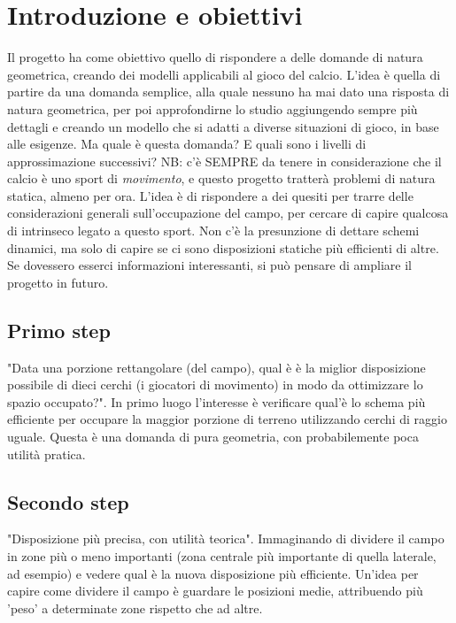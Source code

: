 \documentclass{report}
\begin{document}
\chapter{Introduzione e obiettivi}
Il progetto ha come obiettivo quello di rispondere a delle domande di natura geometrica, creando dei modelli applicabili al gioco del calcio. L'idea è quella di partire da una domanda semplice, alla quale nessuno ha mai dato una risposta di natura geometrica, per poi approfondirne lo studio aggiungendo sempre più dettagli e creando un modello che si adatti a diverse situazioni di gioco, in base alle esigenze.\newline
Ma quale è questa domanda? E quali sono i livelli di approssimazione successivi?\newline
\newline
NB: c'è SEMPRE da tenere in considerazione che il calcio è uno sport di \textit{movimento}, e questo progetto tratterà problemi di natura statica, almeno per ora. L'idea è di rispondere a dei quesiti per trarre delle considerazioni generali sull'occupazione del campo, per cercare di capire qualcosa di intrinseco legato a questo sport. Non c'è la presunzione di dettare schemi dinamici, ma solo di capire se ci sono disposizioni statiche più efficienti di altre.\newline
Se dovessero esserci informazioni interessanti, si può pensare di ampliare il progetto in futuro.



\section{Primo step}
"Data una porzione rettangolare (del campo), qual è è la miglior disposizione possibile di dieci cerchi (i giocatori di movimento) in modo da ottimizzare lo spazio occupato?".
\newline
\newline
In primo luogo l'interesse è verificare qual'è lo schema più efficiente per occupare la maggior porzione di terreno utilizzando cerchi di raggio uguale. Questa è una domanda di pura geometria, con probabilemente poca utilità pratica. 

\section{Secondo step}
"Disposizione più precisa, con utilità teorica".
\newline
\newline
Immaginando di dividere il campo in zone più o meno importanti (zona centrale più importante di quella laterale, ad esempio) e vedere qual è la nuova disposizione più efficiente.
Un'idea per capire come dividere il campo è guardare le posizioni medie, attribuendo più 'peso' a determinate zone rispetto che ad altre.
\end{document}
